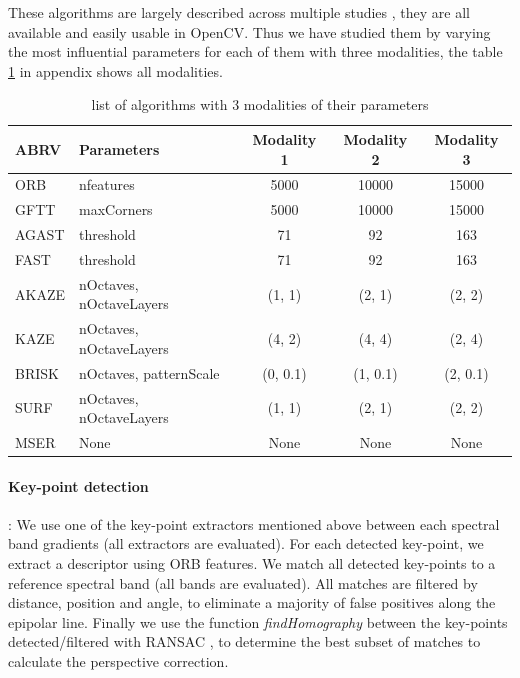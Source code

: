 \documentclass[../thesis.tex]{subfiles}
\begin{document}
	\par These algorithms are largely described across multiple studies \cite{DantasDiasJunior, Tareen2018ACA, Zhang2016EXTENSIONAE, ali2016comparison},
	they are all available and easily usable in OpenCV. Thus we have studied them by varying the most influential parameters for each of them with three modalities,
	the table \ref{tab:used-algorithms} in appendix shows all modalities.
	
	
	\begin{table}[H]
		\centering
		\caption{list of algorithms with 3 modalities of their parameters}
		\begin{tabular}{|l|l|c|c|c| } 
			\hline
			\textbf{ABRV} & \textbf{Parameters} & \textbf{Modality 1} & \textbf{Modality 2} & \textbf{Modality 3} \\
			\hline
			ORB & nfeatures & 5000 & 10000 & 15000 \\
			GFTT & maxCorners & 5000 & 10000 & 15000 \\
			AGAST & threshold & 71 & 92 & 163 \\
			FAST & threshold & 71 & 92 & 163 \\
			AKAZE & nOctaves, nOctaveLayers & (1, 1) & (2, 1) & (2, 2) \\
			KAZE & nOctaves, nOctaveLayers & (4, 2) & (4, 4) & (2, 4) \\
			BRISK & nOctaves, patternScale & (0, 0.1) & (1, 0.1) & (2, 0.1)  \\
			SURF  & nOctaves, nOctaveLayers & (1, 1) & (2, 1) & (2, 2) \\
			MSER & None & None & None & None \\
			\hline
		\end{tabular}
		\label{tab:used-algorithms}
	\end{table}
	
	\paragraph{Key-point detection} : \label{sec:perspective}
	We use one of the key-point extractors mentioned above between each spectral band gradients (all extractors are evaluated).
	For each detected key-point, we extract a descriptor using ORB features.
	We match all detected key-points to a reference spectral band (all bands are evaluated).
	All matches are filtered by distance, position and angle, to eliminate a majority of false positives along the epipolar line.
	Finally we use the function \textit{findHomography} between the key-points detected/filtered with RANSAC \cite{Fischler:1981:RSC:358669.358692},
	to determine the best subset of matches to calculate the perspective correction.
	
\end{document}
